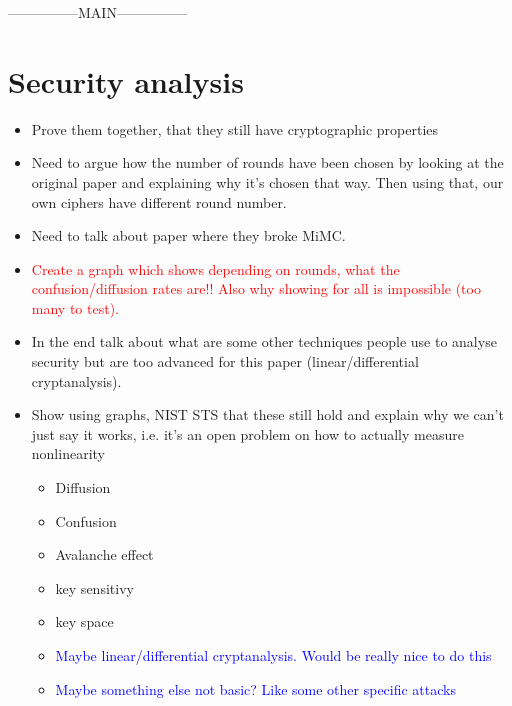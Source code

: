 \documentclass{Resources/UoBLab1}
\theoremstyle{definition}
\begin{document}
---------------MAIN---------------

\section{Security analysis}
\begin{itemize}
    \item Prove them together, that they still have cryptographic properties
    \item Need to argue how the number of rounds have been chosen by looking at the original paper and explaining why it's chosen that way. Then using that, our own ciphers have different round number.
    \item Need to talk about paper where they broke MiMC.
    \item \textcolor{red}{Create a graph which shows depending on rounds, what the confusion/diffusion rates are!! Also why showing for all is impossible (too many to test).}
    \item In the end talk about what are some other techniques people use to analyse security but are too advanced for this paper (linear/differential cryptanalysis).
    \item Show using graphs, NIST STS that these still hold and explain why we can't just say it works, i.e. it's an open problem on how to actually measure nonlinearity \begin{itemize}
        \item Diffusion
        \item Confusion
        \item Avalanche effect
        \item key sensitivy
        \item key space
        \item \textcolor{blue}{Maybe linear/differential cryptanalysis. Would be really nice to do this}
        \item \textcolor{blue}{Maybe something else not basic? Like some other specific attacks}
    \end{itemize}
\end{itemize}

\end{document}
